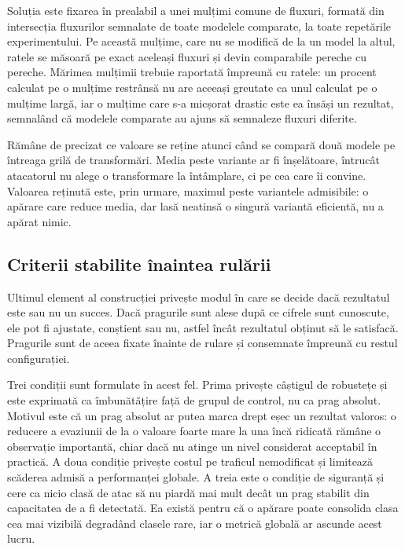 Soluția este fixarea în prealabil a unei mulțimi comune de fluxuri, formată din intersecția fluxurilor semnalate de toate modelele comparate, la toate repetările experimentului. Pe această mulțime, care nu se modifică de la un model la altul, ratele se măsoară pe exact aceleași fluxuri și devin comparabile pereche cu pereche. Mărimea mulțimii trebuie raportată împreună cu ratele: un procent calculat pe o mulțime restrânsă nu are aceeași greutate ca unul calculat pe o mulțime largă, iar o mulțime care s-a micșorat drastic este ea însăși un rezultat, semnalând că modelele comparate au ajuns să semnaleze fluxuri diferite.

Rămâne de precizat ce valoare se reține atunci când se compară două modele pe întreaga grilă de transformări. Media peste variante ar fi înșelătoare, întrucât atacatorul nu alege o transformare la întâmplare, ci pe cea care îi convine. Valoarea reținută este, prin urmare, maximul peste variantele admisibile: o apărare care reduce media, dar lasă neatinsă o singură variantă eficientă, nu a apărat nimic.

\subsection{Criterii stabilite înaintea rulării}\label{subsec:preinregistrare}

Ultimul element al construcției privește modul în care se decide dacă rezultatul este sau nu un succes. Dacă pragurile sunt alese după ce cifrele sunt cunoscute, ele pot fi ajustate, conștient sau nu, astfel încât rezultatul obținut să le satisfacă. Pragurile sunt de aceea fixate înainte de rulare și consemnate împreună cu restul configurației.

Trei condiții sunt formulate în acest fel. Prima privește câștigul de robustețe și este exprimată ca îmbunătățire față de grupul de control, nu ca prag absolut. Motivul este că un prag absolut ar putea marca drept eșec un rezultat valoros: o reducere a evaziunii de la o valoare foarte mare la una încă ridicată rămâne o observație importantă, chiar dacă nu atinge un nivel considerat acceptabil în practică. A doua condiție privește costul pe traficul nemodificat și limitează scăderea admisă a performanței globale. A treia este o condiție de siguranță și cere ca nicio clasă de atac să nu piardă mai mult decât un prag stabilit din capacitatea de a fi detectată. Ea există pentru că o apărare poate consolida clasa cea mai vizibilă degradând clasele rare, iar o metrică globală ar ascunde acest lucru.

